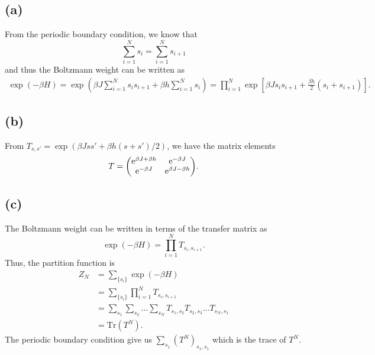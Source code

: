 \documentclass{article}
\newcommand{\me}{\mathrm{e}}
\begin{document}
\subsection*{(a)}
From the periodic boundary condition, we know that 
\begin{equation}
    \sum_{i=1}^N s_i=\sum_{i=1}^N s_{i+1}
\end{equation}
and thus the Boltzmann weight can be written as
\begin{equation}
    \begin{split}
        \exp(-\beta H)=\exp(\beta J\sum_{i=1}^N s_i s_{i+1}+\beta h \sum_{i=1}^N s_i)=\prod_{i=1}^N \exp[\beta J s_i s_{i+1}+\frac{\beta h}{2}(s_i+s_{i+1})].
    \end{split}
\end{equation}

\subsection*{(b)}
From $T_{s,s'}=\exp(\beta J s s'+\beta h(s+s')/2)$, we have the matrix elements
\begin{equation}
    T=\mqty(
        \me^{\beta J+\beta h} & \me^{-\beta J}\\
        \me^{-\beta J} & \me^{\beta J-\beta h}
    ).
\end{equation}

\subsection*{(c)}
The Boltzmann weight can be written in terms of the transfer matrix as
\begin{equation}
    \exp(-\beta H)=\prod_{i=1}^N T_{s_i,s_{i+1}}.
\end{equation}
Thus, the partition function is
\begin{equation}
    \begin{split}
        Z_N&=\sum_{\{s_i\}}\exp(-\beta H)\\
         &=\sum_{\{s_i\}}\prod_{i=1}^N T_{s_i,s_{i+1}}\\
         &=\sum_{s_1}\sum_{s_2}\dots\sum_{s_N} T_{s_1,s_2}T_{s_2,s_3}\dots T_{s_N,s_1}\\
         &=\text{Tr}(T^N).
    \end{split}
\end{equation}
The periodic boundary condition give us $\sum_{s_1}(T^N)_{s_1,s_1}$ which is the trace of $T^N$.    
\end{document}
